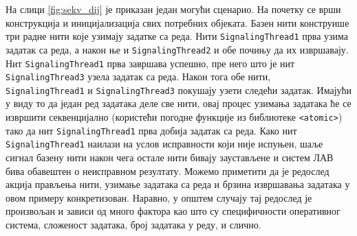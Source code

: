 \documentclass[12pt,oneside]{memoir}
\begin{document}
 На слици \ref{fig:sekv_dij}  је приказан један могући сценарио. На почетку се врши конструкција и иницијализација свих потребних објеката. Базен нити конструише три радне нити које узимају задатке са реда. Нити  \texttt{SignalingThread1} прва узима задатак са реда, а након ње и \texttt{SignalingThread2} и обе почињу да их извршавају. Нит \texttt{SignalingThread1} прва завршава успешно, пре него што је нит \texttt{SignalingThread3} узела задатак са реда. Након тога обе нити,  \texttt{SignalingThread1} и  \texttt{SignalingThread3} покушају узети следећи задатак. Имајући у виду то да један ред задатака деле све нити, овај процес узимања задатака ће се извршити секвенцијално (користећи погодне функције из библиотеке  \texttt{<atomic>}) тако да нит \texttt{SignalingThread1} прва добија задатак са реда. Како нит  \texttt{SignalingThread1} наилази на услов исправности који није испуњен, шаље сигнал базену нити након чега остале нити бивају заустављене и систем ЛАВ бива обавештен о неисправном резултату. Можемо приметити да је редослед акција прављења нити, узимање задатака са реда и брзина извршавања задатака у овом примеру конкретизован. Наравно, у општем случају тај редослед је произвољан и зависи од много фактора као што су специфичности оперативног система, сложеност задатака, број задатака у реду, и слично.  
\end{document}

